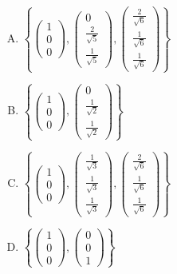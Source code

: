 \documentclass[11pt]{article}
\begin{document}
\begin{enumerate}[(A)]
\item \(\left\{
\begin{pmatrix}1\\0\\0\end{pmatrix},
\begin{pmatrix}0\\\frac{2}{\sqrt{5}}\\\frac{1}{\sqrt{5}}\end{pmatrix},
\begin{pmatrix}\frac{2}{\sqrt{6}}\\\frac{1}{\sqrt{6}}\\\frac{1}{\sqrt{6}}\end{pmatrix}
\right\}\)
\item \(\left\{
\begin{pmatrix}1\\0\\0\end{pmatrix},
\begin{pmatrix}0\\\frac{1}{\sqrt{2}}\\\frac{1}{\sqrt{2}}\end{pmatrix}
\right\}\)
\item \(\left\{
\begin{pmatrix}1\\0\\0\end{pmatrix},
\begin{pmatrix}\frac{1}{\sqrt{3}}\\\frac{1}{\sqrt{3}}\\\frac{1}{\sqrt{3}}\end{pmatrix},
\begin{pmatrix}\frac{2}{\sqrt{6}}\\\frac{1}{\sqrt{6}}\\\frac{1}{\sqrt{6}}\end{pmatrix}
\right\}\)
\item \(\left\{
\begin{pmatrix}1\\0\\0\end{pmatrix},
\begin{pmatrix}0\\0\\1\end{pmatrix}
\right\}\)
\end{enumerate}
\end{document}
